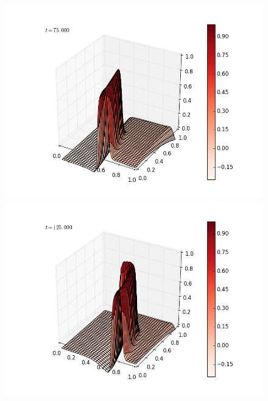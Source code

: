 \documentclass[12pt]{article}
\begin{document}
\begin{figure}[H]
\includegraphics[scale=0.4]{partc_fast_frames/partc_fast_fig05.png}
\includegraphics[scale=0.4]{partc_fast_frames/partc_fast_fig07.png}
\end{figure}
\end{document}
